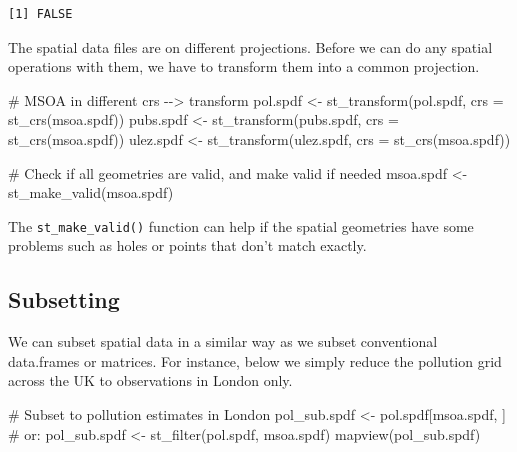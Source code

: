 \documentclass[
  letterpaper,
  DIV=11,
  numbers=noendperiod]{scrreprt}
\newenvironment{Shaded}{\begin{snugshade}}{\end{snugshade}}
\newcommand{\AttributeTok}[1]{\textcolor[rgb]{0.40,0.45,0.13}{#1}}
\newcommand{\CommentTok}[1]{\textcolor[rgb]{0.37,0.37,0.37}{#1}}
\newcommand{\FunctionTok}[1]{\textcolor[rgb]{0.28,0.35,0.67}{#1}}
\newcommand{\NormalTok}[1]{\textcolor[rgb]{0.00,0.23,0.31}{#1}}
\newcommand{\OtherTok}[1]{\textcolor[rgb]{0.00,0.23,0.31}{#1}}
\begin{document}
\begin{verbatim}
[1] FALSE
\end{verbatim}

The spatial data files are on different projections. Before we can do
any spatial operations with them, we have to transform them into a
common projection.

\begin{Shaded}
\begin{Highlighting}[]
\CommentTok{\# MSOA in different crs {-}{-}\textgreater{} transform}
\NormalTok{pol.spdf }\OtherTok{\textless{}{-}} \FunctionTok{st\_transform}\NormalTok{(pol.spdf, }\AttributeTok{crs =} \FunctionTok{st\_crs}\NormalTok{(msoa.spdf))}
\NormalTok{pubs.spdf }\OtherTok{\textless{}{-}} \FunctionTok{st\_transform}\NormalTok{(pubs.spdf, }\AttributeTok{crs =} \FunctionTok{st\_crs}\NormalTok{(msoa.spdf))}
\NormalTok{ulez.spdf }\OtherTok{\textless{}{-}} \FunctionTok{st\_transform}\NormalTok{(ulez.spdf, }\AttributeTok{crs =} \FunctionTok{st\_crs}\NormalTok{(msoa.spdf))}


\CommentTok{\# Check if all geometries are valid, and make valid if needed}
\NormalTok{msoa.spdf }\OtherTok{\textless{}{-}} \FunctionTok{st\_make\_valid}\NormalTok{(msoa.spdf)}
\end{Highlighting}
\end{Shaded}

The \texttt{st\_make\_valid()} function can help if the spatial
geometries have some problems such as holes or points that don't match
exactly.

\hypertarget{subsetting}{%
\subsection{Subsetting}\label{subsetting}}

We can subset spatial data in a similar way as we subset conventional
data.frames or matrices. For instance, below we simply reduce the
pollution grid across the UK to observations in London only.

\begin{Shaded}
\begin{Highlighting}[]
\CommentTok{\# Subset to pollution estimates in London}
\NormalTok{pol\_sub.spdf }\OtherTok{\textless{}{-}}\NormalTok{ pol.spdf[msoa.spdf, ] }\CommentTok{\# or:}
\NormalTok{pol\_sub.spdf }\OtherTok{\textless{}{-}} \FunctionTok{st\_filter}\NormalTok{(pol.spdf, msoa.spdf)}
\FunctionTok{mapview}\NormalTok{(pol\_sub.spdf)}
\end{Highlighting}
\end{Shaded}
\end{document}

